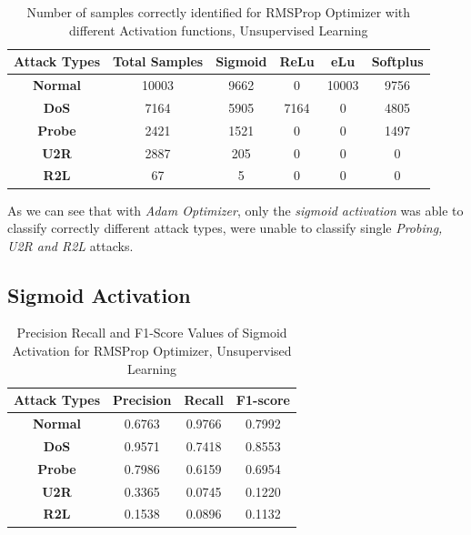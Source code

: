 \documentclass[12pt, a4paper]{report}
\begin{document}
\begin{appendices}
 
	\begin{table}[h]
	\centering
	\captionsetup{justification=centering,margin=2cm}
	\begin{tabular}{|c|c|c|c|c|c|}
	\hline
	\textbf{Attack Types} & \textbf{Total Samples} & \textbf{Sigmoid} & \textbf{ReLu} & \textbf{eLu} & \textbf{Softplus} \\ \hline
	\textbf{Normal}       & 10003                  & 9662            & 0         & 10003        & 9756           \\ \hline
	\textbf{DoS}          & 7164                  & 5905            & 7164         & 0        & 4805             \\ \hline
	\textbf{Probe}        & 2421                  & 1521             & 0          & 0         & 1497              \\ \hline
	\textbf{U2R}          & 2887                    & 205             & 0           & 0          & 0               \\ \hline
	\textbf{R2L}          & 67                     & 5               & 0            & 0           & 0                \\ \hline
	\end{tabular}
	\caption{Number of samples correctly identified for RMSProp Optimizer with different Activation functions, Unsupervised Learning}
	\label{confusion_RMSProp_tf}
	\end{table}
  
  As we can see that with \textit{Adam Optimizer}, only the \textit{sigmoid activation} was able to classify correctly different attack types, were unable to classify single \textit{Probing, U2R and R2L} attacks.
   \clearpage
   \subsection{Sigmoid Activation}
 	 \begin{table}[ht]
		\centering
		\captionsetup{justification=centering,margin=2cm}
		\begin{tabular}{|c|c|c|c|}
		\hline
		\textbf{Attack Types} & \textbf{Precision} & \textbf{Recall} & \textbf{F1-score} \\ \hline
		\textbf{Normal}       & 0.6763             & 0.9766          & 0.7992            \\ \hline
		\textbf{DoS}          & 0.9571             & 0.7418          & 0.8553            \\ \hline
		\textbf{Probe}        & 0.7986             & 0.6159          & 0.6954            \\ \hline
		\textbf{U2R}          & 0.3365             & 0.0745          & 0.1220            \\ \hline
		\textbf{R2L}          & 0.1538             & 0.0896          & 0.1132            \\ \hline
		\end{tabular}
		\caption{Precision Recall and F1-Score Values of Sigmoid Activation for RMSProp Optimizer, Unsupervised Learning}
		\label{classification sigmoid RMSProp tf}
		\end{table} 
  

\end{appendices}
\end{document}
